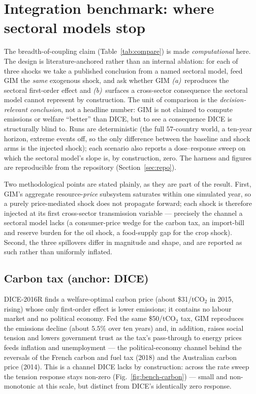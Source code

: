 \documentclass[11pt,a4paper]{article}
\begin{document}
\clearpage
\section{Integration benchmark: where sectoral models stop}
\label{app:benchmark}

The breadth-of-coupling claim (Table~\ref{tab:compare}) is made \emph{computational} here. The
design is literature-anchored rather than an internal ablation: for each of three shocks we take a
published conclusion from a named sectoral model, feed GIM the \emph{same} exogenous shock, and ask
whether GIM \emph{(a)}~reproduces the sectoral first-order effect and \emph{(b)}~surfaces a
cross-sector consequence the sectoral model cannot represent by construction. The unit of comparison
is the \emph{decision-relevant conclusion}, not a headline number: GIM is not claimed to compute
emissions or welfare ``better'' than DICE, but to see a consequence DICE is structurally blind to.
Runs are deterministic (the full $57$-country world, a ten-year horizon, extreme events off, so the
only difference between the baseline and shock arms is the injected shock); each scenario also
reports a dose--response sweep on which the sectoral model's slope is, by construction, zero. The
harness and figures are reproducible from the repository (Section~\ref{sec:repo}).

Two methodological points are stated plainly, as they are part of the result. First, GIM's aggregate
resource-\emph{price} subsystem saturates within one simulated year, so a purely price-mediated shock
does not propagate forward; each shock is therefore injected at its first cross-sector transmission
variable --- precisely the channel a sectoral model lacks (a consumer-price wedge for the carbon tax,
an import-bill and reserve burden for the oil shock, a food-supply gap for the crop shock). Second,
the three spillovers differ in magnitude and shape, and are reported as such rather than uniformly
inflated.

\subsection{Carbon tax (anchor: DICE)}

DICE-2016R \citep{nordhaus2017} finds a welfare-optimal carbon price (about \$31/tCO$_2$ in 2015,
rising) whose only first-order effect is lower emissions; it contains no labour market and no
political economy. Fed the same \$50/tCO$_2$ tax, GIM reproduces the emissions decline (about $5.5\%$
over ten years) and, in addition, raises social tension and lowers government trust as the tax's
pass-through to energy prices feeds inflation and unemployment --- the political-economy channel
behind the reversals of the French carbon and fuel tax (2018) and the Australian carbon price (2014).
This is a channel DICE lacks by construction: across the rate sweep the tension response stays
non-zero (Fig.~\ref{fig:bench-carbon}) --- small and non-monotonic at this scale, but distinct from
DICE's identically zero response.
\end{document}
